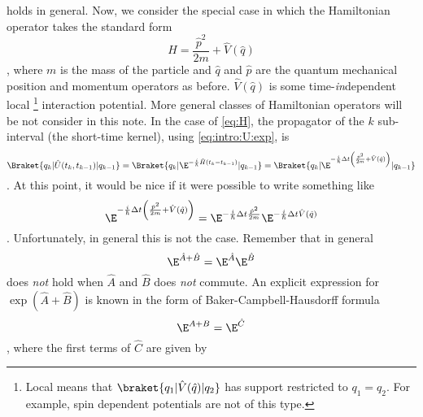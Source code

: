  holds in general. Now, we consider the special case in
which  the
Hamiltonian operator takes the standard form 
\begin{dmath}[label={H}]
\hat{H} = \frac{\hat{p}^{2}}{2m} + \hat{V} (\hat{q}) 
\end{dmath},
where
$m$ is the mass of the particle and 
$\hat{q}$ and $\hat{p}$ are the quantum
mechanical position and momentum operators as before.
$\hat{V}(\hat{q})$ is some time-\emph{in}dependent local%
\footnote{Local means that  $\braket{q_{1} | \hat{V}(\hat{q})|q_{2}}$ has
support restricted to $q_{1} = q_{2}$. For example, spin dependent potentials
are not of this type.} interaction potential.
More general classes of Hamiltonian operators will be not consider in this note.
In the case of \cref{eq:H}, the propagator of the $k$\ordth{} sub-interval (the
short-time kernel), using \cref{eq:intro:U:exp}, is
\begin{dmath*}
\Braket{q_{k} | \hat{U}(t_{k}, t_{k-1}) | q_{k-1}} =
 \Braket{q_{k} | \E^{-\frac{i}{\hslash} \hat{H} (t_{k} - t_{k-1}) } | q_{k-1}}
=
\Braket{ q_{k} | \E^{- \frac{i}{\hslash} \Delta t \left(
	 \frac{\hat{p}^{2}}{2m}+
\hat{V}(\hat{q}) \right) } | q_{k-1}} 
\end{dmath*}.
At this point, it would be nice if it were possible to write something like
\begin{dmath*}
   \E^{- \frac{i}{\hslash} \Delta t \left( \frac{\hat{p}^{2}}{2m} +  \hat{V}(\hat{q})
      \right)} = 
   \E^{- \frac{i}{\hslash} \Delta t  \frac{\hat{p}^{2}}{2m}}
   \E^{- \frac{i}{\hslash} \Delta t \hat{V}(\hat{q})}
\end{dmath*}.
Unfortunately, in general this is not the case.
Remember that in general
\begin{dmath*}
\E^{\hat{A}+\hat{B}} = \E^{\hat{A}} \E^{\hat{B}} 
\end{dmath*}
does \emph{not} hold when $\hat{A}$ and $\hat{B}$ does \emph{not} commute.
An explicit expression for $\exp \left( \hat{A}+\hat{B}\right)$ is known in the form of 
Baker-Campbell-Hausdorff formula
\begin{dmath*}
\E^{A+B} = \E^{\hat{C}} 
\end{dmath*},
where the first terms of $\hat{C}$ are given by 


